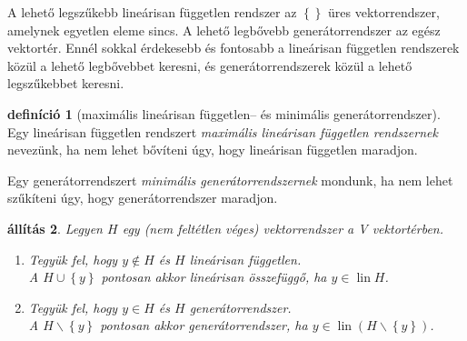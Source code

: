 \documentclass[9pt, a4paper, showtrims]{memoir}
\theoremstyle{plain}
\newtheorem{proposition}{állítás}[chapter]
\theoremstyle{remark}
\theoremstyle{definition}
\newtheorem{definition}[proposition]{definíció}
\DeclareMathOperator{\lin}{lin}
\begin{document}
A lehető legszűkebb lineárisan független rendszer az $\left\{  \right\}$ üres vektorrendszer,
amelynek egyetlen eleme sincs.
A lehető legbővebb generátorrendszer az egész vektortér.
Ennél sokkal érdekesebb és fontosabb a lineárisan független rendszerek közül a lehető legbővebbet keresni,
és generátorrendszerek közül a lehető legszűkebbet keresni.
\begin{definition}[maximális lineárisan független-- és minimális generátorrendszer]
	Egy lineárisan független rendszert \emph{maximális lineárisan független rendszernek} nevezünk,
	ha nem lehet bővíteni úgy, hogy lineárisan független maradjon.

	Egy generátorrendszert \emph{minimális generátorrendszernek} mondunk, ha nem lehet szűkíteni úgy,
	hogy generátorrendszer maradjon.
\end{definition}
\begin{proposition}
    Legyen $H$ egy (nem feltétlen véges) vektorrendszer a V vektortérben.
    \begin{enumerate}
        \item Tegyük fel, hogy $y\notin H$ és $H$ lineárisan független.
            \\
            A $H\cup\left\{ y \right\}$ pontosan akkor lineárisan összefüggő, ha $y\in\lin H$.
        \item Tegyük fel, hogy $y\in H$ és $H$ generátorrendszer.
            \\
            A $H\smallsetminus\left\{ y \right\}$ pontosan akkor generátorrendszer, ha $y\in\lin\left( H\smallsetminus \left\{ y \right\} \right)$.
            \qedhere
    \end{enumerate}
\end{proposition}
\end{document}
